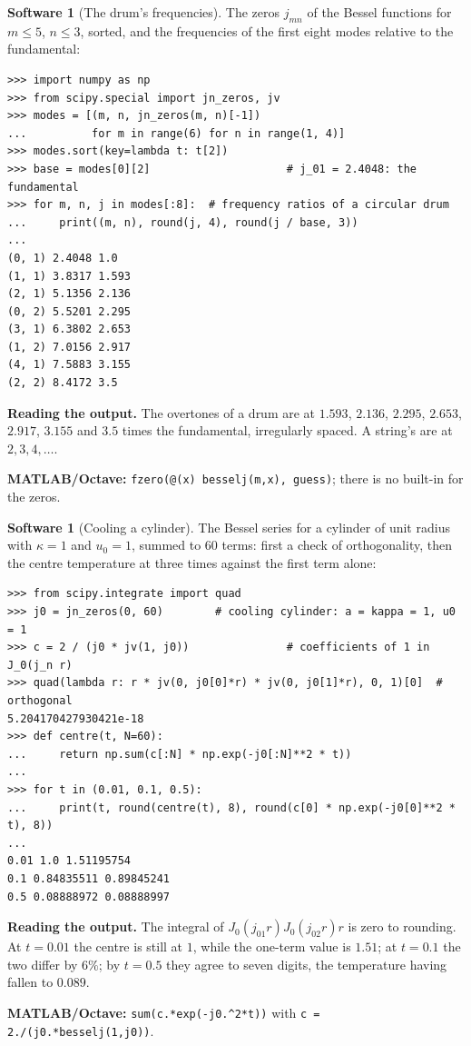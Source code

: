 \documentclass[11pt,a4paper]{article}
\numberwithin{equation}{section}
\theoremstyle{definition}
\newtheorem{software}[thm]{Software}
\begin{document}
\begin{software}[The drum's frequencies]
\label{sw:besselzeros}
The zeros $j_{mn}$ of the Bessel functions for $m \leq 5$, $n \leq 3$, sorted, and the frequencies of the first eight modes relative to the fundamental:
{\small\begin{verbatim}
>>> import numpy as np
>>> from scipy.special import jn_zeros, jv
>>> modes = [(m, n, jn_zeros(m, n)[-1])
...          for m in range(6) for n in range(1, 4)]
>>> modes.sort(key=lambda t: t[2])
>>> base = modes[0][2]                     # j_01 = 2.4048: the fundamental
>>> for m, n, j in modes[:8]:  # frequency ratios of a circular drum
...     print((m, n), round(j, 4), round(j / base, 3))
...
(0, 1) 2.4048 1.0
(1, 1) 3.8317 1.593
(2, 1) 5.1356 2.136
(0, 2) 5.5201 2.295
(3, 1) 6.3802 2.653
(1, 2) 7.0156 2.917
(4, 1) 7.5883 3.155
(2, 2) 8.4172 3.5
\end{verbatim}}
\textbf{Reading the output.} The overtones of a drum are at $1.593$, $2.136$, $2.295$, $2.653$, $2.917$, $3.155$ and $3.5$ times the fundamental, irregularly spaced. A string's are at $2, 3, 4, \ldots$.

\textbf{MATLAB/Octave:} \texttt{fzero(@(x) besselj(m,x), guess)}; there is no built-in for the zeros.
\end{software}

\begin{software}[Cooling a cylinder]
\label{sw:cylinder}
The Bessel series for a cylinder of unit radius with $\kappa = 1$ and $u_0 = 1$, summed to $60$ terms: first a check of orthogonality, then the centre temperature at three times against the first term alone:
{\small\begin{verbatim}
>>> from scipy.integrate import quad
>>> j0 = jn_zeros(0, 60)        # cooling cylinder: a = kappa = 1, u0 = 1
>>> c = 2 / (j0 * jv(1, j0))               # coefficients of 1 in J_0(j_n r)
>>> quad(lambda r: r * jv(0, j0[0]*r) * jv(0, j0[1]*r), 0, 1)[0]  # orthogonal
5.204170427930421e-18
>>> def centre(t, N=60):
...     return np.sum(c[:N] * np.exp(-j0[:N]**2 * t))
...
>>> for t in (0.01, 0.1, 0.5):
...     print(t, round(centre(t), 8), round(c[0] * np.exp(-j0[0]**2 * t), 8))
...
0.01 1.0 1.51195754
0.1 0.84835511 0.89845241
0.5 0.08888972 0.08888997
\end{verbatim}}
\textbf{Reading the output.} The integral of $J_0(j_{01}r)J_0(j_{02}r)r$ is zero to rounding. At $t = 0.01$ the centre is still at $1$, while the one-term value is $1.51$; at $t = 0.1$ the two differ by $6\%$; by $t = 0.5$ they agree to seven digits, the temperature having fallen to $0.089$.

\textbf{MATLAB/Octave:} \texttt{sum(c.*exp(-j0.\^{}2*t))} with \texttt{c = 2./(j0.*besselj(1,j0))}.
\end{software}
\end{document}
